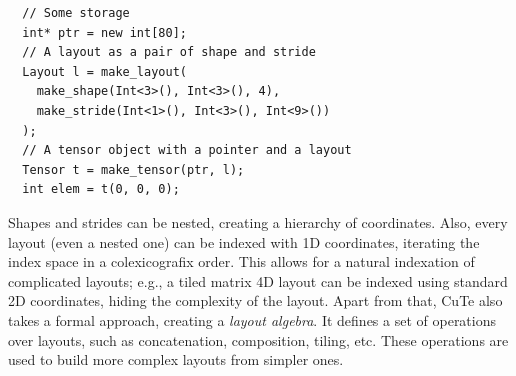 \begin{verbatim}
  // Some storage
  int* ptr = new int[80];
  // A layout as a pair of shape and stride
  Layout l = make_layout(
    make_shape(Int<3>(), Int<3>(), 4),
    make_stride(Int<1>(), Int<3>(), Int<9>())
  );
  // A tensor object with a pointer and a layout
  Tensor t = make_tensor(ptr, l);
  int elem = t(0, 0, 0);
\end{verbatim}

Shapes and strides can be nested, creating a hierarchy of coordinates. Also, every layout (even a nested one) can be indexed with 1D coordinates, iterating the index space in a colexicografix order. This allows for a natural indexation of complicated layouts; e.g., a tiled matrix 4D layout can be indexed using standard 2D coordinates, hiding the complexity of the layout. 
Apart from that, CuTe also takes a formal approach, creating a \emph{layout algebra}. It defines a set of operations over layouts, such as concatenation, composition, tiling, etc. These operations are used to build more complex layouts from simpler ones.





